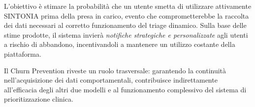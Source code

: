 L'obiettivo è stimare la probabilità che un utente smetta di utilizzare attivamente SINTONIA prima della presa in carico, evento che comprometterebbe la raccolta dei dati necessari al corretto funzionamento del triage dinamico. Sulla base delle stime prodotte, il sistema invierà \textit{notifiche strategiche e personalizzate} agli utenti a rischio di abbandono, incentivandoli a mantenere un utilizzo costante della piattaforma.

Il Churn Prevention riveste un ruolo trasversale: garantendo la continuità nell'acquisizione dei dati comportamentali, contribuisce indirettamente all'efficacia degli altri due modelli e al funzionamento complessivo del sistema di prioritizzazione clinica.

